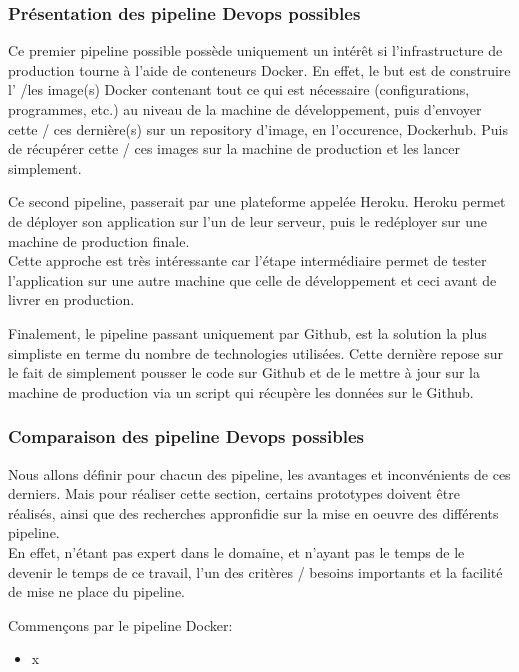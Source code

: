 \documentclass[
    iai, %
    il, %
]{heig-tb}
\begin{document}
\subsubsection{Présentation des pipeline Devops possibles}
Ce premier pipeline possible possède uniquement un intérêt si l'infrastructure de production tourne à l'aide de conteneurs Docker. En effet, le but est de construire l' /les image(s) Docker contenant tout ce qui est nécessaire (configurations, programmes, etc.) au niveau de la machine de développement, puis d'envoyer cette / ces dernière(s) sur un repository d'image, en l'occurence, Dockerhub. Puis de récupérer cette / ces images sur la machine de production et les lancer simplement.

Ce second pipeline, passerait par une plateforme appelée Heroku. Heroku permet de déployer son application sur l'un de leur serveur, puis le redéployer sur une machine de production finale.\\
Cette approche est très intéressante car l'étape intermédiaire permet de tester l'application sur une autre machine que celle de développement et ceci avant de livrer en production.

Finalement, le pipeline passant uniquement par Github, est la solution la plus simpliste en terme du nombre de technologies utilisées. Cette dernière repose sur le fait de simplement pousser le code sur Github et de le mettre à jour sur la machine de production via un script qui récupère les données sur le Github.

\subsubsection{Comparaison des pipeline Devops possibles}
Nous allons définir pour chacun des pipeline, les avantages et inconvénients de ces derniers.
Mais pour réaliser cette section, certains prototypes doivent être réalisés, ainsi que des recherches appronfidie sur la mise en oeuvre des différents pipeline.\\
En effet, n'étant pas expert dans le domaine, et n'ayant pas le temps de le devenir le temps de ce travail, l'un des critères / besoins importants et la facilité de mise ne place du pipeline.

Commençons par le pipeline Docker:
\begin{itemize}
    \item x
\end{itemize}
\end{document}
